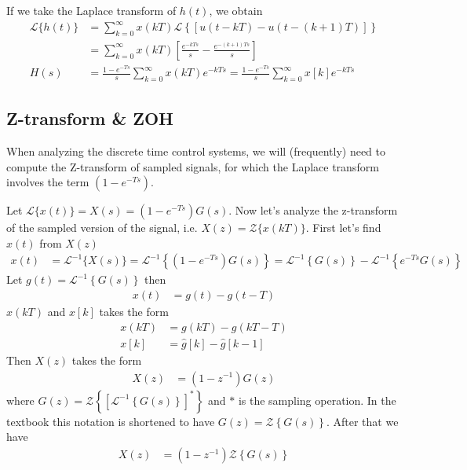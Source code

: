\documentclass[twoside]{article}
\begin{document}
If we take the Laplace transform of $h(t)$, we obtain
%
\begin{align*}
\mathcal{L} \lbrace h(t) \rbrace &= \sum\limits_{k=0}^{\infty} x(kT)
                                   \mathcal{L} \left\lbrace  \left[
                                   u(t-kT) - u(t-(k+1)T) \right]
                                   \right\rbrace
\\
&= \sum\limits_{k=0}^{\infty} x(kT) \left[
                                   \frac{e^{-k T s}}{s} -
  \frac{e^{-(k+1) T s}}{s}\right]
\\
H(s) &= \frac{1 - e^{-Ts}}{s} \sum\limits_{k=0}^{\infty} x(kT) e^{-k T s} =
  \frac{1 - e^{-Ts}}{s} \sum\limits_{k=0}^{\infty} x[k] e^{-k T s}
\end{align*}

\subsection*{Z-transform \& ZOH}

When analyzing the discrete time control systems,
we will (frequently) need to compute the Z-transform of sampled
signals, for which the Laplace transform involves the 
term $\left( 1 - e^{-T s}  
\right)$. 

Let $\mathcal{L} \lbrace x(t) \rbrace=  X(s) = \left( 1 - e^{-T s} \right) G(s)$. Now let's analyze the z-transform of the sampled version 
of the signal, i.e. $X(z) = \mathcal{Z} \lbrace x(k T) \rbrace$.
First let's find $x(t)$ from $X(z)$
%
\begin{align*}
x(t) &= \mathcal{L}^{-1} \lbrace X(s) \rbrace = \mathcal{L}^{-1} \left\lbrace \left( 1 - e^{-T s} \right) G(s) \right\rbrace 
=  \mathcal{L}^{-1} \left\lbrace G(s) \right\rbrace
- \mathcal{L}^{-1} \left\lbrace e^{-Ts} G(s) \right\rbrace
 \end{align*}
%
Let $g(t) = \mathcal{L}^{-1} \left\lbrace G(s)
\right\rbrace$ then
%
\begin{align*}
x(t) &= g(t) - g(t-T)
 \end{align*}
%
$x(kT)$ and $x[k]$ takes the form
%
\begin{align*}
x(k T) &= g(k T) - g(kT -T)
\\
x[k] &= \hat{g}[k] - \hat{g}[k-1]
 \end{align*}
%
Then $X(z)$ takes the form
%
\begin{align*}
X(z) &= \left( 1 - z^{-1} \right) G(z) 
 \end{align*}
%
where $G(z) = \mathcal{Z} \left\lbrace \left[ \mathcal{L}^{-1}
  \left\lbrace G(s) \right\rbrace \right]^* \right\rbrace$ and $*$ is the sampling operation.
In the textbook this notation is shortened to have
$G(z) = \mathcal{Z} \left\lbrace G(s) \right\rbrace$.
After that we have
%
\begin{align*}
X(z) &= \left( 1 - z^{-1} \right) \mathcal{Z} \left\lbrace G(s) \right\rbrace
 \end{align*}
%
\end{document}
